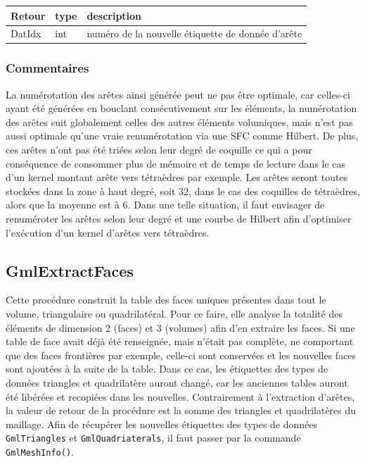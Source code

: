 \documentclass[a4paper,12pt]{article}
\begin{document}
\medskip

\begin{tabular}{|m{2cm}|m{1.5cm}|m{10.5cm}|}
\hline
Retour     & type   & description \\
\hline
DatIdx     & int    & numéro de la nouvelle étiquette de donnée d'arête\\
\hline
\end{tabular}

\subsubsection*{Commentaires}
La numérotation des arêtes ainsi générée peut ne pas être optimale, car celles-ci ayant été générées en bouclant consécutivement sur les éléments, la numérotation des arêtes suit globalement celles des autres éléments volumiques, mais n'est pas aussi optimale qu'une vraie renumérotation via une SFC comme Hilbert.
De plus, ces arêtes n'ont pas été triées selon leur degré de coquille ce qui a pour conséquence de consommer plus de mémoire et de temps de lecture dans le cas d'un kernel montant arête vers tétraèdres par exemple.
Les arêtes seront toutes stockées dans la zone à haut degré, soit 32, dans le cas des coquilles de tétraèdres, alors que la moyenne est à 6.
Dans une telle situation, il faut envisager de renuméroter les arêtes selon leur degré et une courbe de Hilbert afin d’optimiser l'exécution d'un kernel d'arêtes vers tétraèdres.


\subsection{GmlExtractFaces}
Cette procédure construit la table des faces uniques présentes dans tout le volume, triangulaire ou quadrilatéral.
Pour ce faire, elle analyse la totalité des éléments de dimension 2 (faces) et 3 (volumes) afin d'en extraire les faces.
Si une table de face avait déjà été renseignée, mais n'était pas complète, ne comportant que des faces frontières par exemple, celle-ci sont conservées et les nouvelles faces sont ajoutées à la suite de la table. Dans ce cas, les étiquettes des types de données triangles et quadrilatère auront changé, car les anciennes tables auront été libérées et recopiées dans les nouvelles. Contrairement à l'extraction d'arêtes, la valeur de retour de la procédure est la somme des triangles et quadrilatères du maillage. Afin de récupérer les nouvelles étiquettes des types de données {\tt GmlTriangles} et {\tt GmlQuadriaterals}, il faut passer par la commande {\tt GmlMeshInfo()}.
\end{document}

